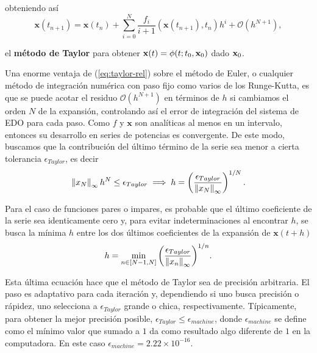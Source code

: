 obteniendo así 
\begin{equation}
\mathbf{x}(t_{n+1}) = \mathbf{x}(t_n) + \sum_{i=0}^N \frac{f_i}{i+1} \left(\mathbf{x}(t_{n+1}),t_n \right) h^i + \mathcal{O}(h^{N+1}),
\label{eq:taylor-rel}
\end{equation}

el \textbf{método de Taylor} para obtener $\mathbf{x}(t) = \phi(t;t_0,\mathbf{x}_0)$ dado $\mathbf{x}_0$.

Una enorme ventaja de (\ref{eq:taylor-rel}) sobre el método de Euler, o cualquier método de integración numérica con paso fijo como varios de los Runge-Kutta, es que se puede acotar el residuo $\mathcal{O}(h^{N+1})$ en términos de $h$ si cambiamos el orden $N$ de la expansión, controlando así el error de integración del sistema de EDO para cada paso. Como $f$ y $\mathbf{x}$ son analíticas al menos en un intervalo, entonces su desarrollo en series de potencias es convergente. De este modo, buscamos que la contribución del último término de la serie sea menor a cierta tolerancia $\epsilon_{Taylor}$, es decir
\begin{equation*}
\left\lVert x_N\right\rVert_\infty h^N \leq \epsilon_{Taylor} \implies h = \left( \frac{\epsilon_{Taylor}}{\left\lVert x_N\right\rVert_\infty} \right)^{1/N}.
\end{equation*} 

Para el caso de funciones pares o impares, es probable que el último coeficiente de la serie sea identicamente cero y, para evitar indeterminaciones al encontrar $h$, se busca la mínima $h$ entre los dos últimos coeficientes de la expansión de $\mathbf{x}(t+h)$
\begin{equation}
h = \min_{n \in [N-1,N]}{ \left( \frac{\epsilon_{Taylor}}{\left\lVert x_n\right\rVert_\infty} \right)^{1/n} }.
\label{eq:stepsize}
\end{equation} 

Esta última ecuación hace que el método de Taylor sea de precisión arbitraria. El paso es adaptativo para cada iteración y, dependiendo si uno busca precisión o rápidez, uno selecciona a $\epsilon_{Taylor}$ grande o chica, respectivamente. Típicamente, para obtener la mejor precisión posible, $\epsilon_{Taylor} \leq \epsilon_{machine}$, donde $\epsilon_{machine}$ se define como el mínimo valor que sumado a $1$ da como resultado algo diferente de $1$ en la computadora. En este caso $\epsilon_{machine} = 2.22 \times 10^{-16}$.


